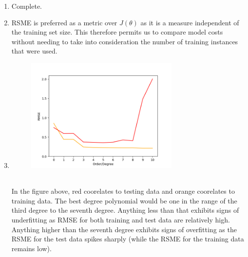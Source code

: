 \documentclass[11pt]{article}
\newcommand{\solution}[1]{{{\color{blue}{\bf Solution:} {#1}}}}
\begin{document}
\begin{enumerate}
\item
\solution{
Complete.
}

\item
\solution{
RSME is preferred as a metric over $J(\theta)$ as it is  a measure independent of the training set size. This therefore permits us to compare model costs without needing to take into consideration the number of training instances that were used.
}

\item
\solution{
\begin{figure}[!htbp]
    \centering
    \includegraphics[width=3in]{4.png}
\end{figure} \\
In the figure above, red coorelates to testing data and orange coorelates to training data. The best degree polynomial would be one in the range of the third degree to the seventh degree. Anything less than that exhibits signs of underfitting as RMSE for both training and test data are relatively high. Anything higher than the seventh degree exhibits signs of overfitting as the RSME for the test data spikes sharply (while the RSME for the training data remains low).
}
\end{enumerate}
\end{document}
